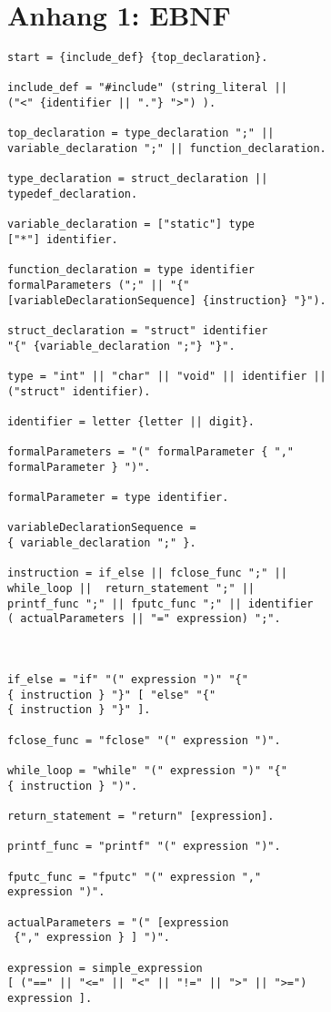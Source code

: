 \documentclass[a4paper,12pt]{article}
\begin{document}
	\newpage
	\section{Anhang 1: EBNF}
	
	\begin{lstlisting}	
start = {include_def} {top_declaration}.

include_def = "#include" (string_literal ||
("<" {identifier || "."} ">") ).

top_declaration = type_declaration ";" ||
variable_declaration ";" || function_declaration.

type_declaration = struct_declaration ||
typedef_declaration.

variable_declaration = ["static"] type 
["*"] identifier.

function_declaration = type identifier 
formalParameters (";" || "{" 
[variableDeclarationSequence] {instruction} "}").

struct_declaration = "struct" identifier
"{" {variable_declaration ";"} "}".

type = "int" || "char" || "void" || identifier || 
("struct" identifier).

identifier = letter {letter || digit}.

formalParameters = "(" formalParameter { "," 
formalParameter } ")".

formalParameter = type identifier.

variableDeclarationSequence =
{ variable_declaration ";" }.

instruction = if_else || fclose_func ";" || 
while_loop ||  return_statement ";" || 
printf_func ";" || fputc_func ";" || identifier 
( actualParameters || "=" expression) ";".



if_else = "if" "(" expression ")" "{" 
{ instruction } "}" [ "else" "{" 
{ instruction } "}" ].

fclose_func = "fclose" "(" expression ")".

while_loop = "while" "(" expression ")" "{"
{ instruction } ")".

return_statement = "return" [expression].

printf_func = "printf" "(" expression ")".

fputc_func = "fputc" "(" expression "," 
expression ")".

actualParameters = "(" [expression
 {"," expression } ] ")".

expression = simple_expression 
[ ("==" || "<=" || "<" || "!=" || ">" || ">=")
expression ].


\end{lstlisting}
\end{document}
